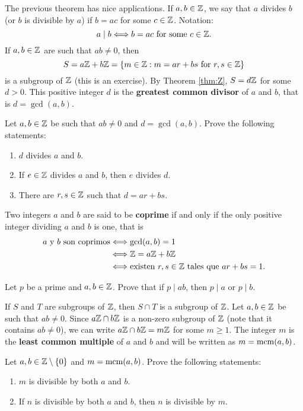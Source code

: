 The previous theorem has nice applications. 
If $a,b\in\mathbb{Z}$, we say that $a$ divides $b$ (or $b$ is divisible by $a$)
if $b=ac$ for some $c\in\mathbb{Z}$. Notation: 
\[
a\mid b\Longleftrightarrow b=ac\text{ for some $c\in\mathbb{Z}$.}
\]
If $a,b\in\mathbb{Z}$ are such that $ab\ne0$, then 
\[
S=a\mathbb{Z}+b\mathbb{Z}=\{m\in\mathbb{Z}:m=ar+bs\text{ for $r,s\in\mathbb{Z}$}\}
\]
is a subgroup of $\mathbb{Z}$ (this is an exercise). 
By Theorem \ref{thm:Z}, $S=d\mathbb{Z}$ for some $d>0$. 
This positive integer $d$
is the \textbf{greatest common divisor} of $a$ and $b$, 
that is $d=\gcd(a,b)$. 

\begin{exercise}
Let $a,b\in\mathbb{Z}$ be such that $ab\ne0$ and $d=\gcd(a,b)$. 
Prove the following statements:
\begin{enumerate}
\item $d$ divides $a$ and $b$.
\item If $e\in\mathbb{Z}$ divides $a$ and $b$, then $e$ divides $d$.
\item There are $r,s\in\mathbb{Z}$ such that $d=ar+bs$.
\end{enumerate}
\end{exercise}

Two integers $a$ and $b$ are said to be \textbf{coprime} if 
and only if the only positive integer dividing 
$a$ and $b$ is one, that is  
\begin{align*}
a\text{ y }b\text{ son coprimos}&\Longleftrightarrow \gcd(a,b)=1\\
&\Longleftrightarrow \mathbb{Z}=a\mathbb{Z}+b\mathbb{Z}\\
&\Longleftrightarrow \text{existen $r,s\in\mathbb{Z}$ tales que $ar+bs=1$.}
\end{align*}

\begin{exercise}
        Let $p$ be a prime and 
        $a,b\in\mathbb{Z}$. Prove that if $p\mid ab$, 
        then $p\mid a$ or $p\mid b$.
\end{exercise}

If $S$ and $T$ are subgroups of $\mathbb{Z}$, then $S\cap T$
is a subgroup of $\mathbb{Z}$.
Let $a,b\in\mathbb{Z}$ be such that $ab\ne 0$. Since $a\mathbb{Z}\cap b\mathbb{Z}$ 
is a non-zero subgroup of $\mathbb{Z}$ (note that it contains $ab\ne 0$), 
we can write  $a\mathbb{Z}\cap b\mathbb{Z}=m\mathbb{Z}$
for some $m\geq1$. The integer $m$
is the \textbf{least common multiple} of $a$ and $b$ 
and will be written as $m=\mathrm{mcm}(a,b)$.

\begin{exercise}
Let $a,b\in\mathbb{Z}\setminus\{0\}$ and $m=\mathrm{mcm}(a,b)$. 
Prove the following statements:
\begin{enumerate}
        \item $m$ is divisible by both $a$ and $b$.
        \item If $n$ is divisible by both $a$ and $b$, then 
        $n$ is divisible by $m$.
\end{enumerate}
\end{exercise}

